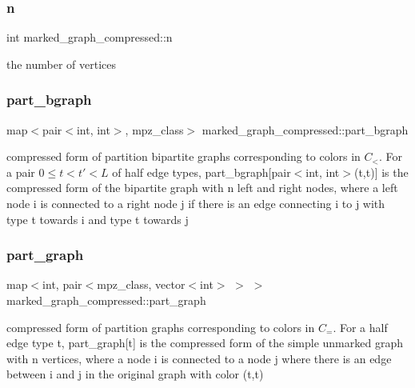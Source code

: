 \subsubsection{\texorpdfstring{n}{n}}
{\footnotesize\ttfamily int marked\+\_\+graph\+\_\+compressed\+::n}



the number of vertices 

\mbox{\label{classmarked__graph__compressed_a7b3267063fba30b45eb21b3ba4e07536}} 
\subsubsection{\texorpdfstring{part\+\_\+bgraph}{part\_bgraph}}
{\footnotesize\ttfamily map$<$pair$<$int, int$>$, mpz\+\_\+class$>$ marked\+\_\+graph\+\_\+compressed\+::part\+\_\+bgraph}



compressed form of partition bipartite graphs corresponding to colors in $C_<$. For a pair $0 \leq t < t' < L$ of half edge types, part\+\_\+bgraph\mbox{[}pair$<$int, int$>$(t,t\textquotesingle{})\mbox{]} is the compressed form of the bipartite graph with n left and right nodes, where a left node i is connected to a right node j if there is an edge connecting i to j with type t towards i and type t\textquotesingle{} towards j 

\mbox{\label{classmarked__graph__compressed_ae179a4737e6eab905c18a94d44ef64b7}} 
\subsubsection{\texorpdfstring{part\+\_\+graph}{part\_graph}}
{\footnotesize\ttfamily map$<$int, pair$<$mpz\+\_\+class, vector$<$int$>$ $>$ $>$ marked\+\_\+graph\+\_\+compressed\+::part\+\_\+graph}



compressed form of partition graphs corresponding to colors in $C_=$. For a half edge type t, part\+\_\+graph\mbox{[}t\mbox{]} is the compressed form of the simple unmarked graph with n vertices, where a node i is connected to a node j where there is an edge between i and j in the original graph with color (t,t) 

